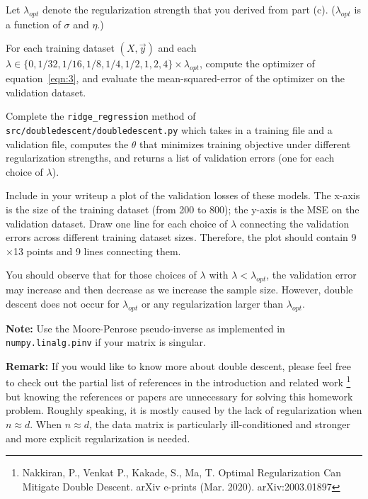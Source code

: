 Let $\lambda_{opt}$ denote the regularization strength that you derived from part (c). ($\lambda_{opt}$  is a function of $\sigma$ and $\eta$.)

For each training dataset $(X, \vec{y})$ and each $\lambda \in \{0, 1/32, 1/16, 1/8, 1/4 , 1/2, 1, 2, 4\} \times \lambda_{opt}$, compute the optimizer of equation~\eqref{eqn:3}, and evaluate the mean-squared-error of the optimizer on the validation dataset. 

Complete the \texttt{ridge\_regression} method of \texttt{src/doubledescent/doubledescent.py} which takes in a training file and a validation file, computes the $\theta$ that minimizes training objective under different regularization strengths, and returns a list of validation errors (one for each choice of $\lambda$).

Include in your writeup a plot of the validation losses of these models. The x-axis is the size of the training dataset (from 200 to 800); the y-axis is the MSE on the validation dataset. Draw one line for each choice of $\lambda$ connecting the validation errors across different training dataset sizes. Therefore, the plot should contain 9$\times$13 points and 9 lines connecting them. 

You should observe that for those choices of $\lambda$ with $\lambda<\lambda_{opt}$, the validation error may increase and then decrease as we increase the sample size. 
However, double descent does not occur for $\lambda_{opt}$ or any regularization larger than $\lambda_{opt}$. 

\textbf{Note:} Use the Moore-Penrose pseudo-inverse as implemented in \texttt{numpy.linalg.pinv} if your matrix is singular.

\textbf{Remark: } If you would like to know more about double descent, please feel free to check out the partial list of references in the introduction and related work \footnote{Nakkiran, P., Venkat P., Kakade, S., Ma, T. Optimal Regularization Can Mitigate Double Descent. arXiv e-prints (Mar. 2020). arXiv:2003.01897} but knowing the references or papers are unnecessary for solving this homework problem. Roughly speaking, it is mostly caused by the lack of regularization when $n \approx d$. When $n\approx d$, the data matrix is particularly ill-conditioned and stronger and more explicit regularization is needed.
